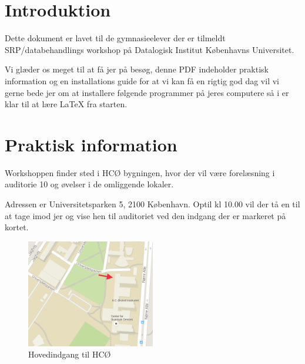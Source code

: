 \documentclass{article}                                                        %
\begin{document}
\section{Introduktion}
    Dette dokument er lavet til de gymnasieelever der er tilmeldt
    SRP/databehandlings workshop på Datalogisk Institut Københavns Universitet.

    Vi glæder os meget til at få jer på besøg, denne PDF indeholder praktisk
    information og en installations guide for at vi kan få en rigtig god
    dag vil vi gerne bede jer om at installere følgende programmer på jeres
    computere så i er klar til at lære LaTeX fra starten.


\section{Praktisk information}
    Workshoppen finder sted i HCØ bygningen, hvor der vil være forelæsning i
    auditorie 10 og øvelser i de omliggende  lokaler.

    Adressen er Universitetsparken 5, 2100 København.
    Optil kl 10.00 vil der tå en til at tage imod jer og vise hen til
    auditoriet ved den indgang der er markeret på kortet.
    \begin{figure}[h!]
        \caption{Hovedindgang til HCØ}
        \centering
        \includegraphics[width=0.5\textwidth]{kort.png}
    \end{figure}
\end{document}
